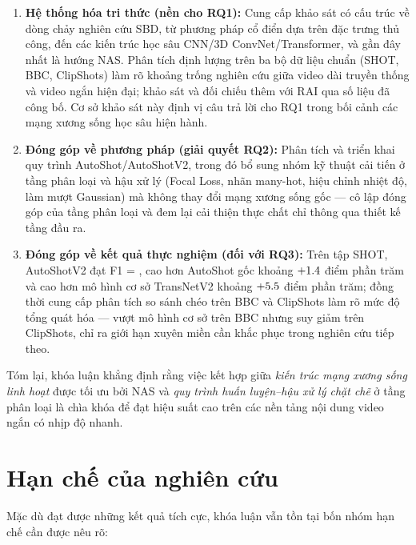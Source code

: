 \begin{enumerate}
    \item \textbf{Hệ thống hóa tri thức (nền cho RQ1):} Cung cấp khảo sát có cấu trúc về dòng chảy nghiên cứu SBD, từ phương pháp cổ điển dựa trên đặc trưng thủ công, đến các kiến trúc học sâu CNN/3D ConvNet/Transformer, và gần đây nhất là hướng NAS. Phân tích định lượng trên ba bộ dữ liệu chuẩn (SHOT, BBC, ClipShots) làm rõ khoảng trống nghiên cứu giữa video dài truyền thống và video ngắn hiện đại; khảo sát và đối chiếu thêm với RAI qua số liệu đã công bố. Cơ sở khảo sát này định vị câu trả lời cho RQ1 trong bối cảnh các mạng xương sống học sâu hiện hành.

    \item \textbf{Đóng góp về phương pháp (giải quyết RQ2):} Phân tích và triển khai quy trình AutoShot/AutoShotV2, trong đó bổ sung nhóm kỹ thuật cải tiến ở tầng phân loại và hậu xử lý (Focal Loss, nhãn many-hot, hiệu chỉnh nhiệt độ, làm mượt Gaussian) mà không thay đổi mạng xương sống gốc --- cô lập đóng góp của tầng phân loại và đem lại cải thiện thực chất chỉ thông qua thiết kế tầng đầu ra.

    \item \textbf{Đóng góp về kết quả thực nghiệm (đối với RQ3):} Trên tập SHOT, AutoShotV2 đạt F1 = \ASVTwoShotFOne, cao hơn AutoShot gốc khoảng $+1.4$ điểm phần trăm và cao hơn mô hình cơ sở TransNetV2 khoảng $+5.5$ điểm phần trăm; đồng thời cung cấp phân tích so sánh chéo trên BBC và ClipShots làm rõ mức độ tổng quát hóa --- vượt mô hình cơ sở trên BBC nhưng suy giảm trên ClipShots, chỉ ra giới hạn xuyên miền cần khắc phục trong nghiên cứu tiếp theo.

\end{enumerate}

Tóm lại, khóa luận khẳng định rằng việc kết hợp giữa \textit{kiến trúc mạng xương sống linh hoạt} được tối ưu bởi NAS và \textit{quy trình huấn luyện--hậu xử lý chặt chẽ} ở tầng phân loại là chìa khóa để đạt hiệu suất cao trên các nền tảng nội dung video ngắn có nhịp độ nhanh.

\section{Hạn chế của nghiên cứu}
\label{sec:han_che}

Mặc dù đạt được những kết quả tích cực, khóa luận vẫn tồn tại bốn nhóm hạn chế cần được nêu rõ:

